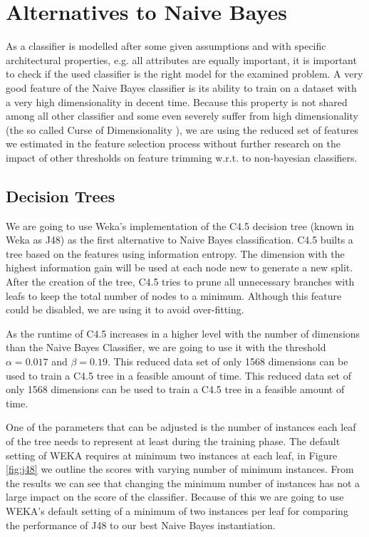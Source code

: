 \section{Alternatives to Naive Bayes}
As a classifier is modelled after some given assumptions and with specific architectural properties, e.g. all attributes are equally important, it is important to check if the used classifier is the right model for the examined problem.
A very good feature of the Naive Bayes classifier is its ability to train on a dataset with a very high dimensionality in decent time.
Because this property is not shared among all other classifier and some even severely suffer from high dimensionality (the so called Curse of Dimensionality \cite{bellman1957dynamic}), we are using the reduced set of features we estimated in the feature selection process without further research on the impact of other thresholds on feature trimming w.r.t. to non-bayesian classifiers.

\subsection{Decision Trees}

We are going to use Weka's \cite{hall2009weka} implementation of the C4.5 decision tree \cite{Quinlan1993} (known in Weka as J48) as the first alternative to Naive Bayes classification.
C4.5 builts a tree based on the features using information entropy.
The dimension with the highest information gain will be used at each node new to generate a new split.
After the creation of the tree, C4.5 tries to prune all unnecessary branches with leafs to keep the total number of nodes to a minimum.
Although this feature could be disabled, we are using it to avoid over-fitting.

As the runtime of C4.5 increases in a higher level with the number of dimensions than the Naive Bayes Classifier, we are going to use it with the threshold $\alpha=0.017$ and $\beta=0.19$.
This reduced data set of only 1568 dimensions can be used to train a C4.5 tree in a feasible amount of time. This reduced data set of only 1568 dimensions can be used to train a C4.5 tree in a feasible amount of time.



One of the parameters that can be adjusted is the number of instances each leaf of the tree needs to represent at least during the training phase.
The default setting of WEKA requires at minimum two instances at each leaf, in Figure \ref{fig:j48} we outline the scores with varying number of minimum instances.
From the results we can see that changing the minimum number of instances has not a large impact on the score of the classifier.
Because of this we are going to use WEKA's default setting of a minimum of two instances per leaf for comparing the performance of J48 to our best Naive Bayes instantiation.

